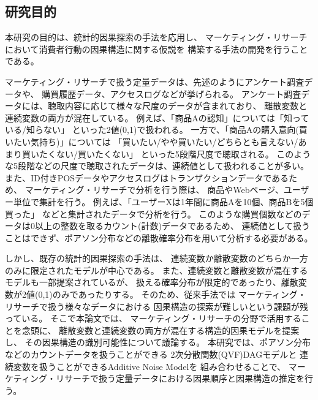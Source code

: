 
\subsection{研究目的}

本研究の目的は、統計的因果探索の手法を応用し、
マーケティング・リサーチにおいて消費者行動の因果構造に関する仮説を
構築する手法の開発を行うことである。

マーケティング・リサーチで扱う定量データは、先述のようにアンケート調査データや、
購買履歴データ、アクセスログなどが挙げられる。
アンケート調査データには、聴取内容に応じて様々な尺度のデータが含まれており、
離散変数と連続変数の両方が混在している。
例えば、「商品Aの認知」については「知っている/知らない」
といった2値(0,1)で扱われる。
一方で、「商品Aの購入意向(買いたい気持ち)」については
「買いたい/やや買いたい/どちらとも言えない/あまり買いたくない/買いたくない」
といった5段階尺度で聴取される。
このような5段階などの尺度で聴取されたデータは、連続値として扱われることが多い。
また、ID付きPOSデータやアクセスログはトランザクションデータであるため、
マーケティング・リサーチで分析を行う際は、
商品やWebページ、ユーザー単位で集計を行う。
例えば、「ユーザーXは1年間に商品Aを10個、商品Bを5個買った」
などと集計されたデータで分析を行う。
このような購買個数などのデータは0以上の整数を取るカウント(計数)データであるため、
連続値として扱うことはできず、ポアソン分布などの離散確率分布を用いて分析する必要がある。

しかし、既存の統計的因果探索の手法は、
連続変数か離散変数のどちらか一方のみに限定されたモデルが中心である。
また、連続変数と離散変数が混在するモデルも一部提案されているが、
扱える確率分布が限定的であったり、離散変数が2値(0,1)のみであったりする。
そのため、従来手法では
マーケティング・リサーチで扱う様々なデータにおける
因果構造の探索が難しいという課題が残っている。
そこで本論文では、
マーケティング・リサーチの分野で活用することを念頭に、
離散変数と連続変数の両方が混在する構造的因果モデルを提案し、
その因果構造の識別可能性について議論する。
本研究では、ポアソン分布などのカウントデータを扱うことができる
2次分散関数(QVF)DAGモデル\cite{Park2017-hw}と
連続変数を扱うことができるAdditive Noise Model\cite{Park2020-ey}を
組み合わせることで、
マーケティング・リサーチで扱う定量データにおける因果順序と因果構造の推定を行う。


